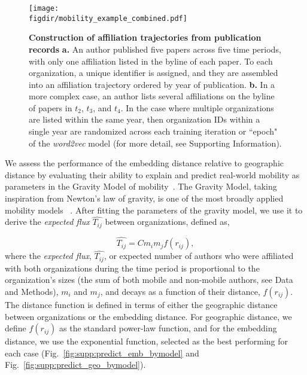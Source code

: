 \documentclass[12pt]{article} %
\def\figdir{../Figs}
\def\SI{Supporting Information}
\begin{document}
%
%
\begin{figure}[ht!]
    \centering
    \texttt{[image: \\figdir/mobility\_example\_combined.pdf]}
    \caption{
        \textbf{Construction of affiliation trajectories from publication records}
        \textbf{a.}
        An author published five papers across five time periods, with only one affiliation listed in the byline of each paper.
        To each organization, a unique identifier is assigned, and they are assembled into an affiliation trajectory ordered by year of publication.
        \textbf{b.}
        In a more complex case, an author lists several affiliations on the byline of papers in $t_{2}$, $t_{3}$, and $t_{4}$.
        In the case where multiple organizations are listed within the same year, then organization IDs within a single year are randomized across each training iteration or ``epoch" of the \textit{word2vec} model (for more detail, see \SI).
    }
    \label{fig:methods:mobility_sentence}
\end{figure}

We assess the performance of the embedding distance relative to geographic distance by evaluating their ability to explain and predict real-world mobility as parameters in the Gravity Model of mobility~\autocite{zipf1946gravity, barbosa2018human}.
The Gravity Model, taking inspiration from Newton's law of gravity, is one of the most broadly applied mobility models~\autocite{curiel2018citygravity, lewer2008immigrationgravity, jung2008highwaygravity, hong2016busgravity, truscott2012epidemicgravity, xia2005measlesgravity} . After fitting the parameters of the gravity model, we use it to derive the \textit{expected flux} $\hat{T_{ij}}$ between organizations, defined as,


\begin{equation}
	\label{eq:gravity_basic}
	\hat{T_{ij}} = Cm_{i}m_{j}f(r_{ij}),
\end{equation}
where the \textit{expected flux}, $\hat{T_{ij}}$, or expected number of authors who were affiliated with both organizations during the time period is proportional to the organization's sizes (the sum of both mobile and non-mobile authors, see Data and Methods), $m_{i}$ and $m_{j}$, and decays as a function of their distance, $f(r_{ij})$.
The distance function is defined in terms of either the geographic distance between organizations or the embedding distance.
For geographic distance, we define $f(r_{ij})$ as the standard power-law function, and for the embedding distance, we use the exponential function, selected as the best performing for each case (Fig.~\ref{fig:supp:predict_emb_bymodel} and Fig.~\ref{fig:supp:predict_geo_bymodel}).
\end{document}
